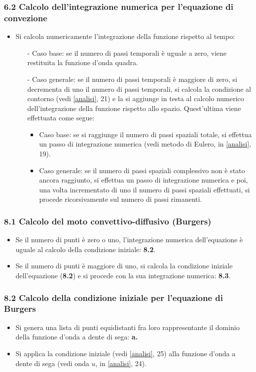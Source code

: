 \subsubsection*{6.2 Calcolo dell'integrazione numerica per l'equazione di convezione}
\begin{itemize}
\item Si calcola numericamente l'integrazione della funzione rispetto al tempo:
\begin{itemize}
\item[-] Caso base: se il numero di passi temporali è uguale a zero, viene restituita la funzione d'onda quadra.
\item[-] Caso generale: se il numero di passi temporali è maggiore di zero, si decrementa di uno il numero di passi temporali, si calcola la condizione al contorno (vedi \ref{analisi}, 21)  e la si aggiunge in testa al calcolo numerico dell'integrazione della funzione rispetto allo spazio. Quest'ultima viene effettuata come segue:
\begin{itemize}
\item Caso base: se si raggiunge il numero di passi spaziali totale, si effettua un passo di integrazione numerica
(vedi metodo di Eulero, in \ref{analisi}, 19).
\item Caso generale: se il numero di passi spaziali complessivo non è stato ancora raggiunto, si effettua un passo di integrazione numerica e poi, una volta incrementato di uno il numero di passi spaziali effettuati, si procede ricorsivamente sul numero di passi rimanenti. 
\end{itemize}
\end{itemize}
\end{itemize}

\subsubsection*{8.1 Calcolo del moto convettivo-diffusivo (Burgers)}
\begin{itemize}
\item Se il numero di punti è zero o uno, l'integrazione numerica dell'equazione è uguale al calcolo della condizione iniziale: \textbf{8.2}.
\item Se il numero di punti è maggiore di uno, si calcola la condizione iniziale dell'equazione (\textbf{8.2}) e si procede con la sua integrazione numerica: \textbf{8.3}. 
\end{itemize}

\subsubsection*{8.2 Calcolo della condizione iniziale per l'equazione di Burgers}
\begin{itemize}
\item Si genera una lista di punti equidistanti fra loro rappresentante il dominio della funzione d'onda a dente di sega: \textbf{a.} 
\item Si applica la condizione iniziale (vedi \ref{analisi}, 25) alla funzione d'onda a dente di sega (vedi onda $u$, in \ref{analisi}, 24). 
\end{itemize}


